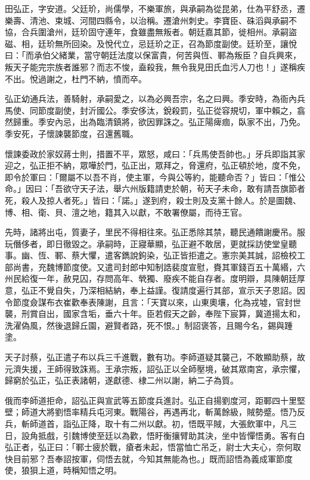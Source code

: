 \begin{pinyinscope}
 田弘正，字安道。父廷玠，尚儒學，不樂軍旅，與承嗣為從昆弟，仕為平舒丞，遷樂壽、清池、束城、河間四縣令，以治稱。遷滄州刺史。李寶臣、硃滔與承嗣不協，合兵圍滄州，廷玠固守連年，食雖盡無叛者。朝廷嘉其節，徙相州。承嗣盜磁、相，廷玠無所回染。及悅代立，忌廷玠之正，召為節度副使。廷玠至，讓悅曰：「而承伯父緒業，當守朝廷法度以保富貴，何苦與恆、鄆為叛臣？自兵興來，叛天子能完宗族者誰邪？而志不悛，盍殺我，無令我見田氏血污人刀也！」遂稱疾不出。悅過謝之，杜門不納，憤而卒。



 弘正幼通兵法，善騎射，承嗣愛之，以為必興吾宗，名之曰興。季安時，為衙內兵馬使、同節度副使，封沂國公。季安侈汰，銳殺罰，弘正從容規切，軍中賴之，翕然歸重。季安內忌，出為臨清鎮將，欲因罪誅之。弘正陽痺痼，臥家不出，乃免。季安死，子懷諫襲節度，召還舊職。



 懷諫委政於家奴蔣士則，措置不平，眾怒，咸曰：「兵馬使吾帥也。」牙兵即詣其家迎之，弘正拒不納，眾嘩於門，弘正出，眾拜之，脅還府，弘正頓於地，度不免，即令於軍曰：「爾屬不以吾不肖，使主軍，今與公等約，能聽命否？」皆曰：「惟公命。」因曰：「吾欲守天子法，舉六州版籍請吏於朝，茍天子未命，敢有請吾旗節者死，殺人及掠人者死。」皆曰：「諾。」遂到府，殺士則及支黨十餘人。於是圖魏、博、相、衛、貝、澶之地，籍其入以獻，不敢署僚屬，而待王官。



 先時，諸將出屯，質妻子，里民不得相往來。弘正悉除其禁，聽民通饋謝慶吊。服玩僭侈者，即日徹毀之。承嗣時，正寢華顯，弘正避不敢居，更就採訪使堂皇聽事。幽、恆、鄆、蔡大懼，遣客鐫說鉤染，弘正皆拒遣之。憲宗美其誠，詔檢校工部尚書，充魏博節度使。又遣司封郎中知制誥裴度宣慰，賚其軍錢百五十萬緡，六州民給復一年，赦見囚，存問高年、煢獨、廢疾不能自存者。度明辯，具陳朝廷厚意，弘正不覺自失，乃深相結納，奉上益謹。復請度遍行其部，宣示天子恩詔。因令節度僉謀布衣崔歡奉表陳謝，且言：「天寶以來，山東奧壤，化為戎墟，官封世襲，刑賞自出，國家含垢，垂六十年。臣若假天之齡，奉陛下宸算，冀道揚太和，洗濯偽風，然後退歸丘園，避賢者路，死不恨。」制詔褒答，且賜今名，錫與踵塗。



 天子討蔡，弘正遣子布以兵三千進戰，數有功。李師道疑其襲己，不敢顯助蔡，故元濟失援，王師得致誅焉。王承宗叛，詔弘正以全師壓境，破其眾南宮，承宗懼，歸窮於弘正，弘正表諸朝，遂獻德、棣二州以謝，納二子為質。



 俄而李師道拒命，詔弘正與宣武等五節度兵進討。弘正自揚劉度河，距鄆四十里堅壁；師道大將劉悟率精兵屯河東。戰陽谷，再遇再北，斬萬餘級，賊勢蹙。悟乃反兵，斬師道首，詣弘正降，取十有二州以獻。初，悟既平賊，大張飲軍中，凡三日，設角抵戲，引魏博使至廷以為歡，悟盱衡攘臂助其決，坐中皆憚悟勇。客有白弘正者，弘正曰：「鄆士疲於戰，瘡者未起，悟當恤亡吊乏，尉士大夫心，奈何取快目前邪？吾奉詔按軍，伺悟去就，今知其無能為也。」既而詔悟為義成軍節度使，狼狽上道，時稱知悟之明。




\end{pinyinscope}

